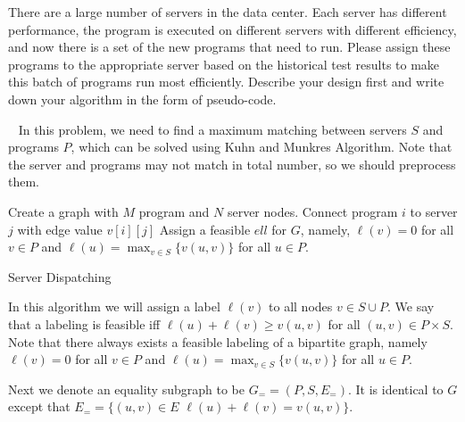 \begin{exercise}[]{There are a large number of servers in the data center. Each server has different performance, the program is executed on different servers with different efficiency, and now there is a set of the new programs that need to run. Please assign these programs to the appropriate server based on the historical test results to make this batch of programs run most efficiently. 
    Describe your design first and write down your algorithm in the form of pseudo-code.
    }
  \begin{solution}
  \par{~}
  In this problem, we need to find a maximum matching between servers $S$ and programs $P$, which can be solved using Kuhn and Munkres Algorithm. Note that the server and programs may not match in total number, so we should preprocess them.



  \begin{algorithm}[H]
    \BlankLine
    Create a graph with $M$ program and $N$ server nodes. Connect program $i$ to server $j$ with edge value $v[i][j]$ \;
    Assign a feasible $ell$ for $G$, namely, $\ell(v)=0$ for all $v \in P$ and $\ell(u)=\max _{v \in S}\{v(u, v)\}$ for all $u \in P .$\;
    \caption{Server Dispatching}
  \end{algorithm}

  In this algorithm we will assign a label $\ell(v)$ to all nodes $v \in S \cup P$. We say that a labeling is feasible iff $\ell(u)+\ell(v) \geq v(u, v)$ for all $(u, v) \in P \times S .$  Note that there always exists a feasible labeling of a bipartite graph, namely $\ell(v)=0$ for all $v \in P$ and $\ell(u)=\max _{v \in S}\{v(u, v)\}$ for all $u \in P .$
  
  Next we denote an equality subgraph to be $G_{=}=\left(P, S, E_{=}\right)$. It is identical to $G$ except that $E_{=}=\{(u, v) \in E$ $\ell(u)+\ell(v)=v(u, v)\} .$ 
  

\end{solution}
\end{exercise}
